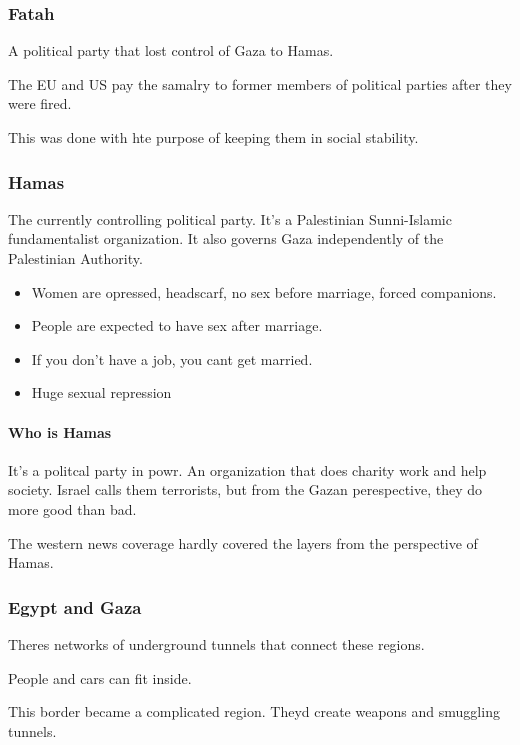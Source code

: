 \subsubsection{Fatah}
A political party that lost control of Gaza to Hamas.

The EU and US pay the samalry to former members of political parties after they were fired.

This was done with hte purpose of keeping them in social stability.


\subsubsection{Hamas} 
The currently controlling political party. It's a Palestinian Sunni-Islamic fundamentalist organization. It also governs Gaza independently of the Palestinian Authority.

\begin{itemize} 
	\item Women are opressed, headscarf, no sex before marriage, forced companions.
	\item People are expected to have sex after marriage.
	\item If you don't have a job, you cant get married.
	\item Huge sexual repression
\end{itemize}

\paragraph{Who is Hamas}

It's a politcal party in powr. An organization that does charity work and help society. 
Israel calls them terrorists, but from the Gazan perespective, they do more good than bad.

The western news coverage hardly covered the layers from the perspective of Hamas.



\subsubsection{Egypt and Gaza}

Theres networks of underground tunnels that connect these regions. 

People and cars can fit inside.

This border became a complicated region. Theyd create weapons and smuggling tunnels.

